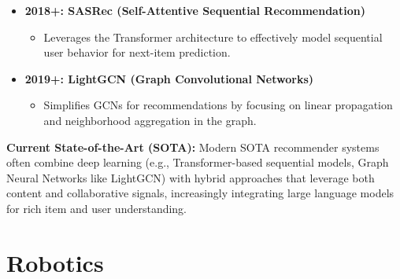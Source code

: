 \documentclass{article}
\begin{document}
\begin{itemize}[leftmargin=1.5em]
\begin{itemize}
  \end{itemize}
\item \textbf{2018+: SASRec (Self-Attentive Sequential Recommendation)}
  \begin{itemize}
    \item Leverages the Transformer architecture to effectively model sequential user behavior for next-item prediction.
  \end{itemize}
\item \textbf{2019+: LightGCN (Graph Convolutional Networks)}
  \begin{itemize}
    \item Simplifies GCNs for recommendations by focusing on linear propagation and neighborhood aggregation in the graph.
  \end{itemize}
\end{itemize}
\textbf{Current State-of-the-Art (SOTA):} Modern SOTA recommender systems often combine deep learning (e.g., Transformer-based sequential models, Graph Neural Networks like LightGCN) with hybrid approaches that leverage both content and collaborative signals, increasingly integrating large language models for rich item and user understanding.

\section{Robotics}
\end{document}
